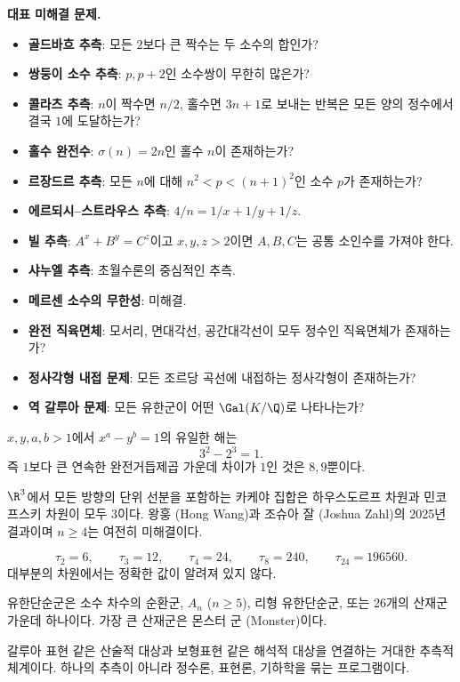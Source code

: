 
\noindent\textbf{대표 미해결 문제.}
\begin{itemize}
\item \textbf{골드바흐 추측}: 모든 $2$보다 큰 짝수는 두 소수의 합인가?
\item \textbf{쌍둥이 소수 추측}: $p,p+2$인 소수쌍이 무한히 많은가?
\item \textbf{콜라츠 추측}: $n$이 짝수면 $n/2$, 홀수면 $3n+1$로 보내는 반복은 모든 양의 정수에서 결국 $1$에 도달하는가?
\item \textbf{홀수 완전수}: $\sigma(n)=2n$인 홀수 $n$이 존재하는가?
\item \textbf{르장드르 추측}: 모든 $n$에 대해 $n^2<p<(n+1)^2$인 소수 $p$가 존재하는가?
\item \textbf{에르되시--스트라우스 추측}: $4/n=1/x+1/y+1/z$.
\item \textbf{빌 추측}: $A^x+B^y=C^z$이고 $x,y,z>2$이면 $A,B,C$는 공통 소인수를 가져야 한다.
\item \textbf{샤누엘 추측}: 초월수론의 중심적인 추측.
\item \textbf{메르센 소수의 무한성}: 미해결.
\item \textbf{완전 직육면체}: 모서리, 면대각선, 공간대각선이 모두 정수인 직육면체가 존재하는가?
\item \textbf{정사각형 내접 문제}: 모든 조르당 곡선에 내접하는 정사각형이 존재하는가?
\item \textbf{역 갈루아 문제}: 모든 유한군이 어떤 $\Gal(K/\Q)$로 나타나는가?
\end{itemize}

\begin{theorem}
$x,y,a,b>1$에서 $x^a-y^b=1$의 유일한 해는
\[
3^2-2^3=1.
\]
즉 $1$보다 큰 연속한 완전거듭제곱 가운데 차이가 $1$인 것은 $8,9$뿐이다.
\end{theorem}

\begin{theorem}[3차원 카케야 정리]
$\R^3$에서 모든 방향의 단위 선분을 포함하는 카케야 집합은 하우스도르프 차원과 민코프스키 차원이 모두 $3$이다. 왕훙 (Hong Wang)과 조슈아 잘 (Joshua Zahl)의 2025년 결과이며 $n\ge4$는 여전히 미해결이다.
\end{theorem}

\begin{fact}[키싱 넘버]
\[
\tau_2=6,\qquad \tau_3=12,\qquad \tau_4=24,\qquad \tau_8=240,\qquad \tau_{24}=196560.
\]
대부분의 차원에서는 정확한 값이 알려져 있지 않다.
\end{fact}

\begin{fact}[유한단순군 분류]
유한단순군은 소수 차수의 순환군, $A_n$ ($n\ge5$), 리형 유한단순군, 또는 26개의 산재군 가운데 하나이다. 가장 큰 산재군은 몬스터 군 (Monster)이다.
\end{fact}

\begin{fact}
갈루아 표현 같은 산술적 대상과 보형표현 같은 해석적 대상을 연결하는 거대한 추측적 체계이다. 하나의 추측이 아니라 정수론, 표현론, 기하학을 묶는 프로그램이다.
\end{fact}
